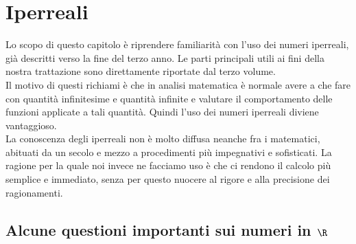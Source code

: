 



\chapter{Iperreali}
\label{sec:01_introduzione}
Lo scopo di questo capitolo è riprendere familiarità con l'uso 
dei numeri iperreali, già descritti verso la fine del terzo anno. 
Le parti principali utili ai fini della nostra trattazione sono 
direttamente riportate dal terzo volume.\\
Il motivo di questi richiami è che in analisi matematica è normale 
avere a che fare con quantità infinitesime e quantità infinite e 
valutare il comportamento delle funzioni applicate a tali quantità. 
Quindi l'uso dei numeri iperreali diviene vantaggioso.\\
La conoscenza degli iperreali non è molto diffusa neanche fra i matematici, 
abituati da un secolo e mezzo a procedimenti più impegnativi e sofisticati.
La ragione per la quale noi invece ne facciamo uso è che ci rendono il 
calcolo 
più semplice e immediato, senza per questo nuocere al rigore e alla 
precisione dei ragionamenti.

\section{Alcune questioni importanti sui numeri in $\R$}
\label{sec:insnum_reali}

